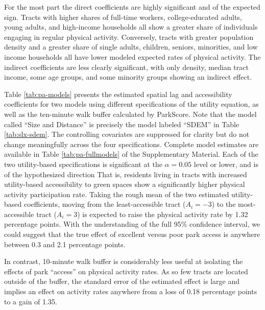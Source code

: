 \documentclass[shortAfour,sageh.bst]{sagej}
\begin{document}
For the most part the direct coefficients are highly significant and of
the expected sign. Tracts with higher shares of full-time workers,
college-educated adults, young adults, and high-income households all
show a greater share of individuals engaging in regular physical
activity. Conversely, tracts with greater population density and a
greater share of single adults, children, seniors, minorities, and low
income households all have lower modeled expected rates of physical
activity. The indirect coefficients are less clearly significant, with
only density, median tract income, some age groups, and some minority
groups showing an indirect effect.

Table \ref{tab:pa-models} presents the estimated spatial lag and
accessibility coefficients for two models using different specifications
of the utility equation, as well as the ten-minute walk buffer
calculated by ParkScore. Note that the model called ``Size and
Distance'' is precisely the model labeled ``SDEM'' in Table
\ref{tab:slx-sdem}. The controlling covariates are suppressed for
clarity but do not change meaningfully across the four specifications.
Complete model estimates are available in Table \ref{tab:pa-fullmodels}
of the Supplementary Material. Each of the two utility-based
specifications is significant at the \(\alpha = 0.05\) level or lower,
and is of the hypothesized direction That is, residents living in tracts
with increased utility-based accessibility to green spaces show a
significantly higher physical activity participation rate. Taking the
rough mean of the two estimated utility-based coefficients, moving from
the least-accessible tract (\(A_i = -3\)) to the most-accessible tract
(\(A_i = 3\)) is expected to raise the physical activity rate by 1.32
percentage points. With the understanding of the full 95\% confidence
interval, we could suggest that the true effect of excellent versus poor
park access is anywhere between 0.3 and 2.1 percentage points.

In contrast, 10-minute walk buffer is considerably less useful at
isolating the effects of park ``access'' on physical activity rates. As
so few tracts are located outside of the buffer, the standard error of
the estimated effect is large and implies an effect on activity rates
anywhere from a loss of 0.18 percentage points to a gain of 1.35.
\end{document}
